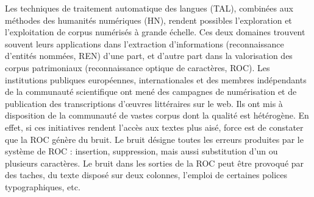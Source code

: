 Les techniques de traitement automatique des langues (TAL), combinées aux méthodes des humanités numériques (HN), rendent possibles l'exploration et l'exploitation de corpus numérisés à grande échelle. Ces deux domaines trouvent souvent leurs applications dans l'extraction d'informations (reconnaissance d'entités nommées, REN) d'une part, et d'autre part dans la valorisation des corpus patrimoniaux (reconnaissance optique de caractères, ROC).
Les institutions publiques européennes, internationales et des membres indépendants de la communauté scientifique
ont mené des campagnes de numérisation et de publication des transcriptions d’œuvres littéraires sur le web. Ils ont mis à disposition de la communauté de vastes corpus dont la qualité est hétérogène.
En effet, si ces initiatives rendent l'accès aux textes plus aisé, force est de constater que la ROC génère du bruit. Le bruit désigne toutes les erreurs produites par le système de ROC : insertion, suppression, mais aussi substitution d'un ou plusieurs caractères. Le bruit dans les sorties de la ROC peut être provoqué par des taches, du texte disposé sur deux colonnes, l'emploi de certaines polices typographiques, etc.


%

